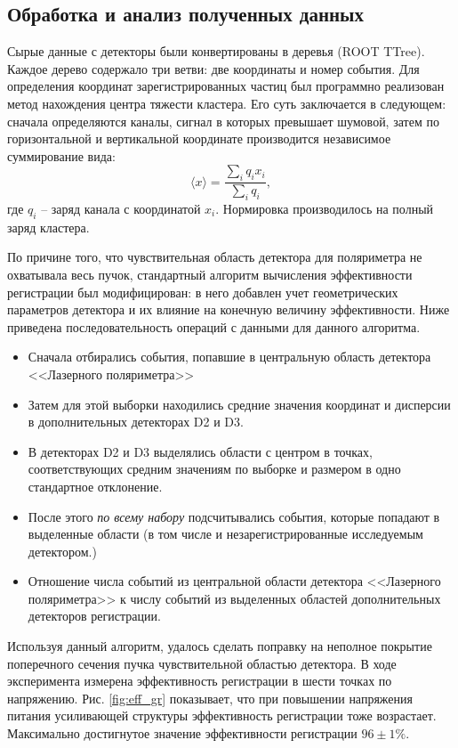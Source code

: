 \subsection{Обработка и анализ полученных данных}\label{sec:eff_res}
Сырые данные с детекторы были конвертированы в деревья (ROOT TTree). Каждое дерево содержало три ветви: две координаты и номер события. Для определения координат зарегистрированных частиц был программно реализован метод нахождения центра тяжести кластера. Его суть заключается в следующем: сначала определяются каналы, сигнал в которых превышает шумовой, затем по горизонтальной и вертикальной координате производится независимое суммирование вида: 
\begin{equation}
 \langle x \rangle = \frac{\sum_{i}q_i x_i}{\sum_{i}q_i},
\end{equation}
где $q_i$ -- заряд канала с координатой $x_i$. Нормировка производилось на полный заряд кластера.
\par По причине того, что чувствительная область детектора для поляриметра не охватывала весь пучок, стандартный алгоритм вычисления эффективности регистрации был модифицирован: в него добавлен учет геометрических параметров детектора и их влияние на конечную величину эффективности. Ниже приведена последовательность операций с данными для данного алгоритма.
\begin{itemize}
	\item Сначала отбирались события, попавшие в центральную область детектора <<Лазерного поляриметра>>
	\item Затем для этой выборки находились средние значения координат и дисперсии в дополнительных детекторах D2 и D3. 
	\item В детекторах D2 и D3 выделялись области с центром в точках, соответствующих средним значениям по выборке и размером в одно стандартное отклонение. 
	\item После этого \textit {по всему набору} подсчитывались события, которые попадают в выделенные области (в том числе и незарегистрированные исследуемым детектором.)
	\item Отношение числа событий из центральной области детектора <<Лазерного поляриметра>> к числу событий из выделенных областей дополнительных детекторов  регистрации. 
\end{itemize}
Используя данный алгоритм, удалось сделать поправку на неполное покрытие поперечного сечения пучка чувствительной областью детектора.
В ходе эксперимента измерена эффективность регистрации в шести точках по напряжению. Рис. \ref{fig:eff_gr} показывает, что при повышении напряжения питания усиливающей структуры эффективность регистрации тоже возрастает. Максимально достигнутое значение эффективности регистрации $96 \pm 1\%$. 
